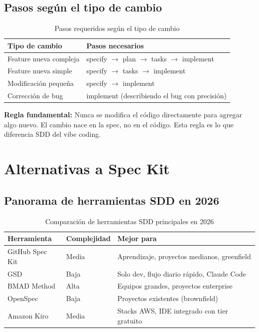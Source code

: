 \documentclass[12pt, a4paper]{report}
\begin{document}
\section{Pasos seg\'un el tipo de cambio}

\begin{table}[H]
\centering
\begin{tabularx}{\textwidth}{lX}
\toprule
\textbf{Tipo de cambio} & \textbf{Pasos necesarios} \\
\midrule
Feature nueva compleja   & specify $\to$ plan $\to$ tasks $\to$ implement \\
Feature nueva simple     & specify $\to$ tasks $\to$ implement \\
Modificaci\'on peque\~na & specify $\to$ implement \\
Correcci\'on de bug      & implement (describiendo el bug con precisi\'on) \\
\bottomrule
\end{tabularx}
\caption{Pasos requeridos seg\'un el tipo de cambio}
\end{table}

\begin{notacaja}
  \textbf{Regla fundamental:} Nunca se modifica el c\'odigo directamente
  para agregar algo nuevo. El cambio nace en la spec, no en el c\'odigo.
  Esta regla es lo que diferencia SDD del vibe coding.
\end{notacaja}

\chapter{Alternativas a Spec Kit}

\section{Panorama de herramientas SDD en 2026}

\begin{table}[H]
\centering
\begin{tabularx}{\textwidth}{llX}
\toprule
\textbf{Herramienta} & \textbf{Complejidad} & \textbf{Mejor para} \\
\midrule
GitHub Spec Kit & Media & Aprendizaje, proyectos medianos, greenfield \\
GSD             & Baja  & Solo dev, flujo diario r\'apido, Claude Code \\
BMAD Method     & Alta  & Equipos grandes, proyectos enterprise \\
OpenSpec        & Baja  & Proyectos existentes (brownfield) \\
Amazon Kiro     & Media & Stacks AWS, IDE integrado con tier gratuito \\
\bottomrule
\end{tabularx}
\caption{Comparaci\'on de herramientas SDD principales en 2026}
\end{table}
\end{document}
